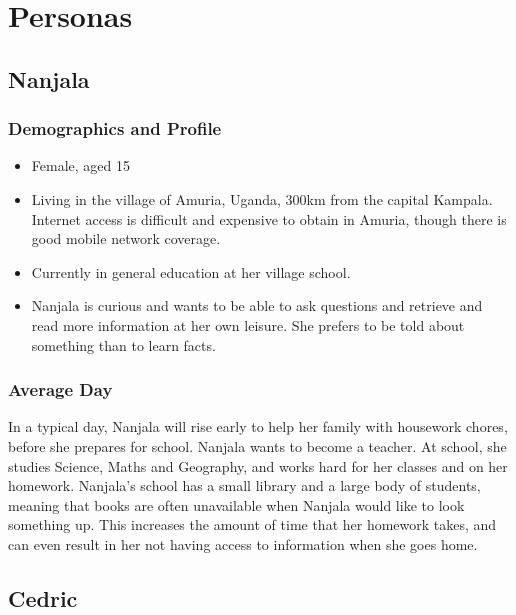\documentclass[authoryearcitations]{UoYCSproject}
\begin{document}
\newpage
\chapter{Personas}
\label{sec:appendixPersonas}
\section{Nanjala}
\subsection{Demographics and Profile}
\begin{itemize}
  \item Female, aged 15
  \item Living in the village of Amuria, Uganda, 300km from the capital Kampala.  Internet access is difficult and expensive to obtain in Amuria, though there is good mobile network coverage.
  \item Currently in general education at her village school.
  \item Nanjala is curious and wants to be able to ask questions and retrieve and read more information at her own leisure.  She prefers to be told about something than to learn facts.
\end{itemize}
\subsection{Average Day}
In a typical day, Nanjala will rise early to help her family with housework chores, before she prepares for school.  Nanjala wants to become a teacher.  At school, she studies Science, Maths and Geography, and works hard for her classes and on her homework.  Nanjala's school has a small library and a large body of students, meaning that books are often unavailable when Nanjala would like to look something up.  This increases the amount of time that her homework takes, and can even result in her not having access to information when she goes home.

\newpage
\section{Cedric}
\end{document}
